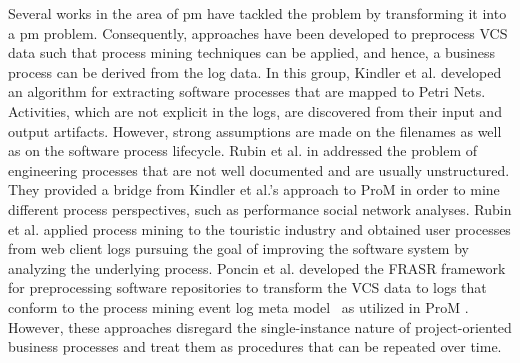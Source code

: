\documentclass[a4paper,11pt]{article}
\begin{document}
Several works in the area of \gls{pm} have tackled the problem by transforming it into a \gls{pm} problem. 
Consequently, approaches have been developed to preprocess VCS data such that process mining techniques can be applied, and hence, a business process can be derived from the log data.
In this group, Kindler et al. \cite{kindler2006activity,kindler2006incremental} developed an algorithm for extracting software processes that are mapped to Petri Nets. Activities, which are not explicit in the logs, are discovered from their input and output artifacts. However, strong assumptions are made on the filenames as well as on the software process lifecycle. %
Rubin et al. in \cite{rubin2007process} addressed the problem of engineering processes that are not well documented and are usually unstructured. They provided a bridge from Kindler et al.'s approach to ProM \cite{van2005prom} in order to mine different process perspectives, such as performance social network analyses. %
Rubin et al. \cite{rubin2014agile} applied process mining to the touristic industry and obtained user processes from web client logs pursuing the goal of improving the software system by analyzing the underlying process.
Poncin et al. \cite{Poncin2011a} developed the FRASR framework for preprocessing software repositories to transform the VCS data to logs that conform to the process mining event log meta model~\cite{van2005meta} as utilized in ProM \cite{van2005prom}.
However, these approaches disregard the single-instance nature of project-oriented business processes and treat them as procedures that can be repeated over time.
\end{document}
